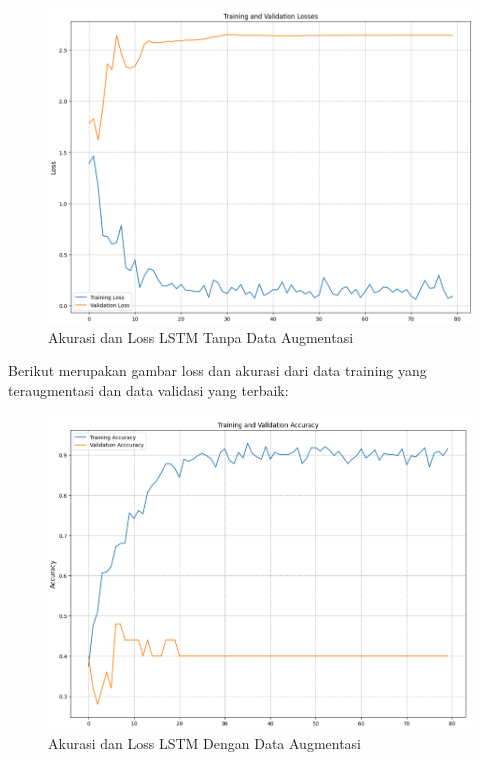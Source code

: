 \begin{figure} [ht] \centering
  \includegraphics[scale=0.55]{gambar/LossLSTMnoAug.png}
  \caption{Akurasi dan Loss LSTM Tanpa Data Augmentasi}
  \label{fig:LossLSTMnoaug}
\end{figure}

\newpage
Berikut merupakan gambar loss dan akurasi dari data training yang teraugmentasi dan
data validasi yang terbaik:
\begin{figure} [ht] \centering
  \includegraphics[scale=0.55]{gambar/AccLSTMaug.png}
  \caption{Akurasi dan Loss LSTM Dengan Data Augmentasi}
  \label{fig:AccLSTMaug}
\end{figure}

